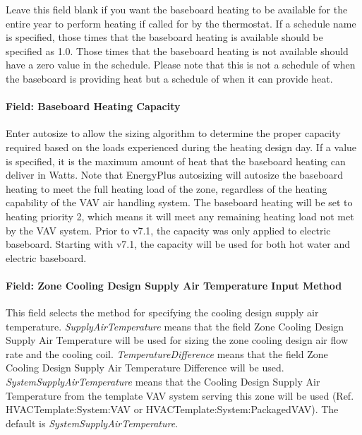 Leave this field blank if you want the baseboard heating to be available for the entire year to perform heating if called for by the thermostat. If a schedule name is specified, those times that the baseboard heating is available should be specified as 1.0. Those times that the baseboard heating is not available should have a zero value in the schedule. Please note that this is not a schedule of when the baseboard is providing heat but a schedule of when it can provide heat.

\paragraph{Field: Baseboard Heating Capacity}\label{field-baseboard-heating-capacity-7}

Enter autosize to allow the sizing algorithm to determine the proper capacity required based on the loads experienced during the heating design day. If a value is specified, it is the maximum amount of heat that the baseboard heating can deliver in Watts. Note that EnergyPlus autosizing will autosize the baseboard heating to meet the full heating load of the zone, regardless of the heating capability of the VAV air handling system. The baseboard heating will be set to heating priority 2, which means it will meet any remaining heating load not met by the VAV system. Prior to v7.1, the capacity was only applied to electric baseboard. Starting with v7.1, the capacity will be used for both hot water and electric baseboard.

\paragraph{Field: Zone Cooling Design Supply Air Temperature Input Method}\label{field-zone-cooling-design-supply-air-temperature-input-method-6}

This field selects the method for specifying the cooling design supply air temperature. \emph{SupplyAirTemperature} means that the field Zone Cooling Design Supply Air Temperature will be used for sizing the zone cooling design air flow rate and the cooling coil. \emph{TemperatureDifference} means that the field Zone Cooling Design Supply Air Temperature Difference will be used. \emph{SystemSupplyAirTemperature} means that the Cooling Design Supply Air Temperature from the template VAV system serving this zone will be used (Ref. HVACTemplate:System:VAV or HVACTemplate:System:PackagedVAV). The default is \emph{SystemSupplyAirTemperature.}

